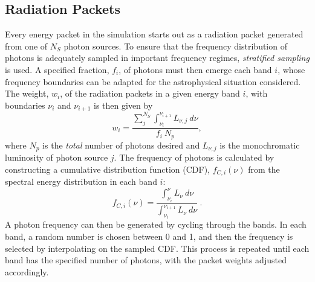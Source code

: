 \subsection{Radiation Packets}

Every energy packet in the simulation starts out as a radiation packet generated
from one of $N_S$ photon sources. To ensure that the frequency distribution
of photons is adequately sampled in important frequency regimes, 
{\em stratified sampling} is used. A specified fraction, $f_i$,
of photons must then emerge each band $i$, whose frequency boundaries
can be adapted for the astrophysical situation considered. 
The weight, $w_i$, of the radiation packets in a given energy band $i$, with boundaries
$\nu_i$ and $\nu_{i+1}$ is then given by
\begin{equation}
w_i = \frac{\sum_j^{N_S} \int_{\nu_i}^{\nu_{i+1}} L_{\nu,j}~d\nu}{f_i~N_p},
\end{equation}
where $N_p$ is the {\em total} number of photons desired 
and $L_{\nu,j}$ is the monochromatic 
luminosity of photon source $j$. 
The frequency of photons is calculated by constructing a 
cumulative distribution function (CDF), $f_{C,i}(\nu)$
from the spectral energy distribution in each band $i$: 
\begin{equation}
f_{C,i} (\nu) = 
\frac{\int_{\nu_i}^{\nu} L_\nu~d\nu}
{\int_{\nu_i}^{\nu_{i+1}} L_\nu~d\nu} ~.
\end{equation}
A photon frequency can then be generated by cycling through the bands. In each band,
a random number is chosen between 0 and 1, and then the frequency is 
selected by interpolating on the sampled CDF. This process is repeated until 
each band has the specified number of photons, with the packet
weights adjusted accordingly.

